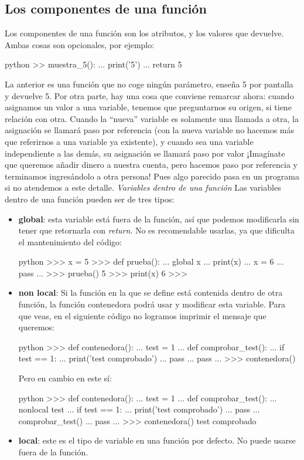 \documentclass{article}
\begin{document}
\subsection{Los componentes de una función}
Los componentes de una función son los atributos, y los valores que devuelve. Ambas cosas son opcionales, por ejemplo:
\begin{mintedbox}{python}
>> muestra_5():
...     print('5')
...     return 5
\end{mintedbox}
La anterior es una función que no coge ningún parámetro, enseña 5 por pantalla y devuelve 5.
Por otra parte, hay una cosa que conviene remarcar ahora: cuando asignamos un valor a una variable, tenemos que preguntarnos su origen, si tiene relación con otra. Cuando la ``nueva'' variable es solamente una llamada a otra, la asignación se llamará paso por referencia (con la nueva variable no hacemos más que referirnos a una variable ya existente), y cuando sea una variable independiente a las demás, su asignación se llamará paso por valor ¡Imagínate que queremos añadir dinero a nuestra cuenta, pero hacemos paso por referencia y terminamos ingresándolo a otra persona! Pues algo parecido pasa en un programa si no atendemos a este detalle.
\textit{Variables dentro de una función}
Las variables dentro de una función pueden ser de tres tipos:
\begin{itemize}
    \item \textbf{global}: esta variable está fuera de la función, así que podemos modificarla sin tener que retornarla con \textit{return}. No es recomendable usarlas, ya que dificulta el mantenimiento del código:
    \begin{mintedbox}{python}
    >>> x = 5
>>> def prueba():
...     global x
...     print(x)
...     x = 6
...     pass
... 
>>> prueba()
5
>>> print(x)
6
>>> 

    \end{mintedbox}
    \item \textbf{non local}: Si la función en la que se define está contenida dentro de otra función, la función contenedora podrá usar y modificar esta variable. Para que veas, en el siguiente código no logramos imprimir el mensaje que queremos:
    \newpage
    \begin{mintedbox}{python}
    >>> def contenedora():
...     test  = 1
...     def comprobar_test():
...             if test == 1:
...                     print('test comprobado')
...             pass
...     pass
... 
>>> contenedora()

    \end{mintedbox}
    Pero en cambio en este sí:
    \begin{mintedbox}{python}
    >>> def contenedora():
...     test = 1
...     def comprobar_test():
...             nonlocal test
...             if test == 1:
...                     print('test comprobado')
...             pass
...     comprobar_test()
...     pass
... 
>>> contenedora()
test comprobado

    \end{mintedbox}
    \item \textbf{local}: este es el tipo de variable en una función por defecto. No puede usarse fuera de la función.
    
\end{itemize}
\end{document}

